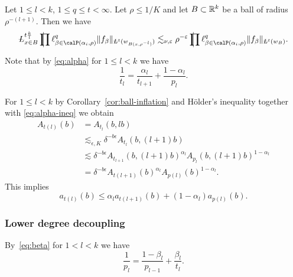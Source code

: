 \begin{corollary}
\label{cor:ball-inflation}
Let $1\le l < k$, $1 \leq q \leq t < \infty$.
Let $\rho \leq 1/K$ and let $B \subset \mathbb{R}^{k}$ be a ball of radius $\rho^{-(l+1)}$.
Then we have
\begin{equation}
\label{eq:ball-inflation}
\avL^{t \frac{k}{l}}_{x\in B} \avprod \ell^{q}_{\beta \in \Part[\alpha_i]{ \rho}} \norm{f_{\beta}}_{\avL^{t}(w_{B(x,\rho^{-l})})}
\lesssim_{\nu,\epsilon} \rho^{-\epsilon}
\avprod \ell^{q}_{\beta \in \Part[\alpha_i]{\rho}} \norm{ f_{\beta} }_{\avL^{t}(w_B)}.
\end{equation}
\end{corollary}

Note that by \eqref{eq:alpha} for $1\leq l < k$ we have
\begin{equation}
\label{eq:alpha-ineq}
\frac{1}{t_{l}}
=
\frac{\alpha_l}{t_{l+1}}+\frac{1-\alpha_l}{p_{l}}.
\end{equation}


For $1 \leq l < k$ by Corollary~\ref{cor:ball-inflation} and H\"older's inequality together with \eqref{eq:alpha-ineq} we obtain
\begin{equation}
\label{eq:est1}
\begin{split}
A_{t(l)}(b)
&=
A_{t_{l}}(b,lb)
\\ &\lesssim_{\epsilon,K}
\delta^{-b\epsilon} A_{t_{l}}(b,(l+1)b)
\\ &\lesssim
\delta^{-b\epsilon} A_{ t_{l+1}}(b,(l+1)b)^{\alpha_{l}}
A_{ p_{l}}(b,(l+1)b)^{1-\alpha_{l}}
\\ &=
\delta^{-b\epsilon} A_{t(l+1)}(b)^{\alpha_{l}} A_{p(l)}(b)^{1-\alpha_{l}}.
\end{split}
\end{equation}
This implies
\begin{equation}
\label{eq:a*:ball-inflation}
a_{t(l)}(b) \leq \alpha_{l} a_{t(l+1)}(b) + (1-\alpha_{l}) a_{p(l)}(b).
\end{equation}

\subsubsection{Lower degree decoupling}
By~\eqref{eq:beta} for $1 < l < k$ we have
\begin{equation}
\label{eq:beta-ineq}
\frac{1}{p_{l}}
=
\frac{1-\beta_l}{p_{l-1}}+\frac{\beta_l}{t_{l}}.
\end{equation}

